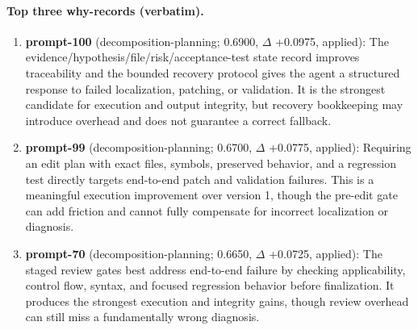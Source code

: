 \paragraph{Top three why-records (verbatim).}\begin{enumerate}\itemsep1pt
\item \textbf{prompt-100} (decomposition-planning; 0.6900, $\Delta$ +0.0975, applied): The evidence/hypothesis/file/risk/acceptance-test state record improves traceability and the bounded recovery protocol gives the agent a structured response to failed localization, patching, or validation. It is the strongest candidate for execution and output integrity, but recovery bookkeeping may introduce overhead and does not guarantee a correct fallback.
\item \textbf{prompt-99} (decomposition-planning; 0.6700, $\Delta$ +0.0775, applied): Requiring an edit plan with exact files, symbols, preserved behavior, and a regression test directly targets end-to-end patch and validation failures. This is a meaningful execution improvement over version 1, though the pre-edit gate can add friction and cannot fully compensate for incorrect localization or diagnosis.
\item \textbf{prompt-70} (decomposition-planning; 0.6650, $\Delta$ +0.0725, applied): The staged review gates best address end-to-end failure by checking applicability, control flow, syntax, and focused regression behavior before finalization. It produces the strongest execution and integrity gains, though review overhead can still miss a fundamentally wrong diagnosis.
\end{enumerate}
